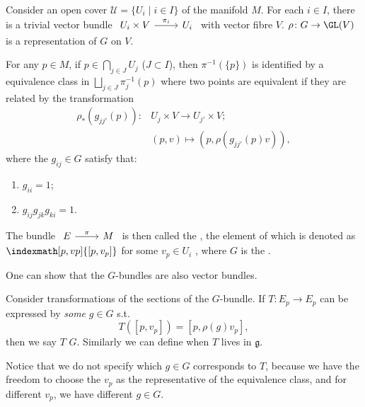 \documentclass[openany, oneside, a5paper]{book}
\begin{document}
\begin{definition}[$G$-bundle]\label{definition: G-bundle}
    Consider an open cover $\mathcal U = \{U_i \mid i \in I\}$ of the manifold $M$. For each $i \in I$, there is a trivial vector bundle $\begin{tikzcd}
        U_i \times V \arrow[r, "\pi_i"] & U_i
    \end{tikzcd}$
    with vector fibre $V$.
    $\rho \colon G \to \GL(V)$ is a representation of $G$ on $V$.    

    For any $p \in M$, if $p \in \bigcap_{j \in J} U_j$ ($J \subset I$),
    then $\pi^{-1}(\{p\})$ is identified 
    by a equivalence class in $\bigsqcup_{j \in J} \pi_j^{-1} (p)$ 
    where two points are equivalent if they are related by the transformation
    \begin{align}
        \rho_*(g_{jj'}(p)) \colon & U_j \times V \to U_{j'} \times V;
        \\
                                & (p, v) \mapsto (p, \rho(g_{jj'}(p)v)),
    \end{align}
    where the  $g_{ij} \in G$ satisfy that:
    \begin{enumerate}
        \item $g_{ii} = 1$;
        \item $g_{ij} g_{jk} g_{ki} = 1$.
    \end{enumerate}

    The bundle $\begin{tikzcd}
        E \arrow[r, "\pi"] & M
    \end{tikzcd}$ is then called the ,
    the element of which is denoted as $\indexmath[p, vp]{[p, v_p]}$ for some $v_p \in U_i$
    , where $G$ is the .
\end{definition}

One can show that the $G$-bundles are also vector bundles.

Consider transformations of the sections of the $G$-bundle.
If $T \colon E_p \to E_p$ can be expressed by \emph{some} $g \in G$ s.t.\ 
\begin{equation}
    T([p, v_p]) = [p, \rho(g) v_p],
\end{equation}
then we say $T$  $G$. 
Similarly we can define when $T$ lives in $\mathfrak{g}$.

Notice that we do not specify which $g \in G$ corresponds to $T$, because we have the freedom to choose the $v_p$ as the representative of the equivalence class, and for different $v_p$, we have different $g \in G$.
\end{document}
